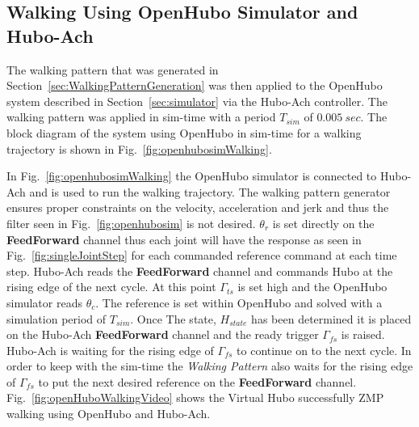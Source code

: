 \subsection{Walking Using OpenHubo Simulator and Hubo-Ach}\label{sec:OpenHuboWalking}

The walking pattern that was generated in Section~\ref{sec:WalkingPatternGeneration} was then applied to the OpenHubo system described in Section~\ref{sec:simulator} via the Hubo-Ach controller.
The walking pattern was applied in sim-time with a period $T_{sim}$ of $0.005~sec$.
The block diagram of the system using OpenHubo in sim-time for a walking trajectory is shown in Fig.~\ref{fig:openhubosimWalking}.



In Fig.~\ref{fig:openhubosimWalking} the OpenHubo simulator is connected to Hubo-Ach and is used to run the walking trajectory.  
The walking pattern generator ensures proper constraints on the velocity, acceleration and jerk and thus the filter seen in Fig.~\ref{fig:openhubosim} is not desired.  
$\theta_r$ is set directly on the \textbf{FeedForward} channel thus each joint will have the response as seen in Fig.~\ref{fig:singleJointStep} for each commanded reference command at each time step.
Hubo-Ach reads the \textbf{FeedForward} channel and commands Hubo at the rising edge of the next cycle.  
At this point $\Gamma_{ts}$ is set high and the OpenHubo simulator reads $\theta_c$.  
The reference is set within OpenHubo and solved with a simulation period of $T_{sim}$.  
Once The state, $H_{state}$ has been determined it is placed on the Hubo-Ach \textbf{FeedForward} channel and the ready trigger $\Gamma_{fs}$ is raised.  
Hubo-Ach is waiting for the rising edge of $\Gamma_{fs}$ to continue on to the next cycle.  
In order to keep with the sim-time the \textit{Walking Pattern} also waits for the rising edge of $\Gamma_{fs}$ to put the next desired reference on the \textbf{FeedForward} channel.
Fig.~\ref{fig:openHuboWalkingVideo} shows the Virtual Hubo successfully ZMP walking using OpenHubo and Hubo-Ach.

